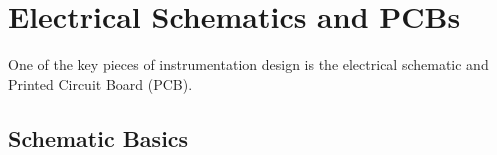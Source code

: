 %

\chapter{Electrical Schematics and PCBs}
\setchapterpreamble[u]{\margintoc}

One of the key pieces of instrumentation design is the electrical schematic and Printed Circuit Board (PCB).

\section{Schematic Basics}


